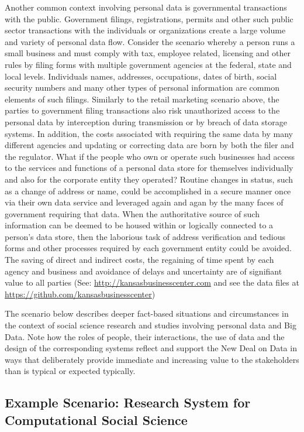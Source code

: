 Another common context involving personal data is governmental transactions with the public.  Government filings, registrations, permits and other such public sector transactions with the individuals or organizations create a large volume and variety of personal data flow.  Consider the scenario whereby a person runs a small business and must comply with tax, employee related, licensing and other rules by filing forms with multiple government agencies at the federal, state and local levels.  Individuals names, addresses, occupations, dates of birth, social security numbers and many other types of personal information are common elements of such filings.  Similarly to the retail marketing scenario above, the parties to government filing transactions also risk unauthorized access to the personal data by interception during transmission or by breach of data storage systems.   In addition, the costs associated with requiring the same data by many different agencies and updating or correcting data are born by both the filer and the regulator.  What if the people who own or operate such businesses had access to the services and functions of a personal data store for themselves individually and also for the corporate entity they operated?  Routine changes in status, such as a change of address or name, could be accomplished in a secure manner once via their own data service and leveraged again and agan by the many faces of government requiring that data.  When the authoritative source of such information can be deemed to be housed within or logically connected to a person's data store, then the laborious task of address verification and tedious forms and other processes required by each government entity could be avoided.  The saving of direct and indirect costs, the regaining of time spent by each agency and business and avoidance of delays and uncertainty are of signifiant value to all parties (See: \url{http://kansasbusinesscenter.com} and see the data files at  \url{https://github.com/kansasbusinesscenter})

The scenario below describes deeper fact-based situations and circumstances in the context of social science research and studies involving personal data and Big Data.  Note how the roles of people, their interactions, the use of data and the design of the corresponding systems reflect and support the New Deal on Data in ways that deliberately provide immediate and increasing value to the stakeholders than is typical or expected typically.


 \subsection{Example Scenario: Research System for Computational Social Science}


